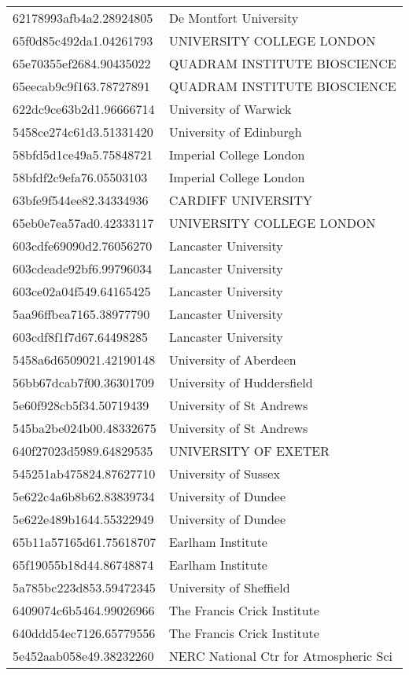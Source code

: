 \begin{tabular}{ll}
62178993afb4a2.28924805 & De Montfort University \\
65f0d85c492da1.04261793 & UNIVERSITY COLLEGE LONDON \\
65e70355ef2684.90435022 & QUADRAM INSTITUTE BIOSCIENCE \\
65eecab9c9f163.78727891 & QUADRAM INSTITUTE BIOSCIENCE \\
622dc9ce63b2d1.96666714 & University of Warwick \\
5458ce274c61d3.51331420 & University of Edinburgh \\
58bfd5d1ce49a5.75848721 & Imperial College London \\
58bfdf2c9efa76.05503103 & Imperial College London \\
63bfe9f544ee82.34334936 & CARDIFF UNIVERSITY \\
65eb0e7ea57ad0.42333117 & UNIVERSITY COLLEGE LONDON \\
603cdfe69090d2.76056270 & Lancaster University \\
603cdeade92bf6.99796034 & Lancaster University \\
603ce02a04f549.64165425 & Lancaster University \\
5aa96ffbea7165.38977790 & Lancaster University \\
603cdf8f1f7d67.64498285 & Lancaster University \\
5458a6d6509021.42190148 & University of Aberdeen \\
56bb67dcab7f00.36301709 & University of Huddersfield \\
5e60f928cb5f34.50719439 & University of St Andrews \\
545ba2be024b00.48332675 & University of St Andrews \\
640f27023d5989.64829535 & UNIVERSITY OF EXETER \\
545251ab475824.87627710 & University of Sussex \\
5e622c4a6b8b62.83839734 & University of Dundee \\
5e622e489b1644.55322949 & University of Dundee \\
65b11a57165d61.75618707 & Earlham Institute \\
65f19055b18d44.86748874 & Earlham Institute \\
5a785bc223d853.59472345 & University of Sheffield \\
6409074c6b5464.99026966 & The Francis Crick Institute \\
640ddd54ec7126.65779556 & The Francis Crick Institute \\
5e452aab058e49.38232260 & NERC National Ctr for Atmospheric Sci \\

\end{tabular}
